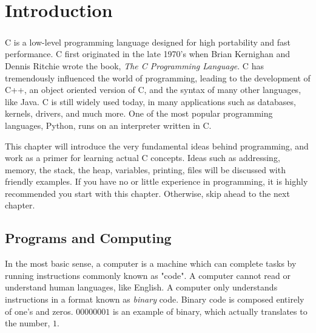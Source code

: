 
\chapter{Introduction}

\paragraph{   } C is a low-level programming language designed for high portability and fast performance. C first originated in the late 1970's when Brian Kernighan and Dennis Ritchie wrote the book, \textit{The C Programming Language}. C has tremendously influenced the world of programming, leading to the development of C++, an object oriented version of C, and the syntax of many other languages, like Java. C is still widely used today, in many applications such as databases, kernels, drivers, and much more. One of the most popular programming languages, Python, runs on an interpreter written in C.

\par This chapter will introduce the very fundamental ideas behind programming, and work as a primer for learning actual C concepts. Ideas such as addressing, memory, the stack, the heap, variables, printing, files will be discussed with friendly examples. If you have no or little experience in programming, it is highly recommended you start with this chapter. Otherwise, skip ahead to the next chapter.

\section{Programs and Computing}

\par In the most basic sense, a computer is a machine which can complete tasks by running instructions commonly known as "code". A computer cannot read or understand human languages, like English. A computer only understands instructions in a format known as \textit{binary} code. Binary code is composed entirely of one's and zeros. $00000001$ is an example of binary, which actually translates to the number, $1$. 
